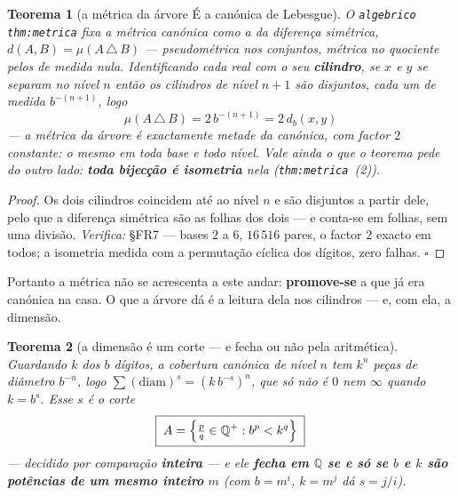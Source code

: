 \documentclass[11pt,a4paper]{article}
\newtheorem{teorema}{Teorema}
\newcommand{\code}[1]{\texttt{\small #1}}
\newcommand{\Q}{\mathbb{Q}}
\begin{document}
\begin{teorema}[a métrica da árvore É a canónica de Lebesgue]\label{thm:metrica-arvore}
O \code{algebrico thm:metrica} fixa a métrica canónica como a da diferença
simétrica, $d(A,B)=\mu(A\,\triangle\,B)$ --- pseudométrica nos conjuntos, métrica
no quociente pelos de medida nula. Identificando cada real com o seu
\textbf{cilindro}, se $x$ e $y$ se separam no nível $n$ então os cilindros de
nível $n{+}1$ são \emph{disjuntos}, cada um de medida $b^{-(n+1)}$, logo
\[
\boxed{\;\mu(A\,\triangle\,B)=2\,b^{-(n+1)}=2\,d_b(x,y)\;}
\]
--- \emph{a métrica da árvore é exactamente metade da canónica}, com factor $2$
constante: o mesmo em toda base e todo nível. Vale ainda o que o teorema pede do
outro lado: \textbf{toda bijecção é isometria} nela (\code{thm:metrica}~(2)).
\end{teorema}

\begin{proof}
Os dois cilindros coincidem até ao nível $n$ e são disjuntos a partir dele, pelo
que a diferença simétrica são as folhas dos dois --- e conta-se em folhas, sem
uma divisão.
\emph{Verifica:} §FR7 --- bases $2$ a $6$, $16\,516$ pares, o factor $2$ exacto
em todos; a isometria medida com a permutação cíclica dos dígitos, zero falhas.
$\square$
\end{proof}

\noindent Portanto a métrica não se acrescenta a este andar: \textbf{promove-se}
a que já era canónica na casa. O que a árvore dá é a leitura dela nos cilindros
--- e, com ela, a dimensão.

\begin{teorema}[a dimensão é um corte --- e fecha ou não pela aritmética]\label{thm:dim}
Guardando $k$ dos $b$ dígitos, a cobertura canónica de nível $n$ tem $k^{n}$
peças de diâmetro $b^{-n}$, logo $\sum(\mathrm{diam})^{s}=(k\,b^{-s})^{n}$, que
só não é $0$ nem $\infty$ quando $k=b^{s}$. Esse $s$ é o corte
\[
\boxed{\;A=\Bigl\{\tfrac{p}{q}\in\Q^{+}: b^{p}<k^{q}\Bigr\}\;}
\]
--- decidido por comparação \textbf{inteira} --- e ele \textbf{fecha em $\Q$ se e
só se $b$ e $k$ são potências de um mesmo inteiro} $m$ (com $b=m^{i}$, $k=m^{j}$
dá $s=j/i$).
\end{teorema}
\end{document}

